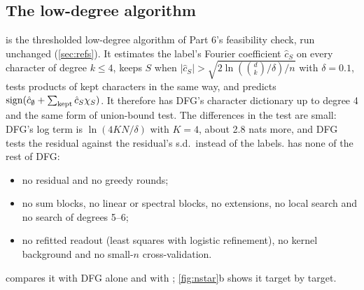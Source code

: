 \subsection{The low-degree algorithm}\label{app:lowdeg}

 is the thresholded low-degree algorithm \cite{linial1993constant} of Part 6's feasibility check, run unchanged (\cref{sec:refs}). It estimates the label's Fourier coefficient $\hat c_S$ on every character of degree $k\le4$, keeps $S$ when $|\hat c_S|>\sqrt{2\ln(\binom dk/\delta)/n}$ with $\delta=0.1$, tests products of kept characters in the same way, and predicts $\mathrm{sign}(\hat c_\emptyset+\sum_{\rm kept}\hat c_S\chi_S)$. It therefore has DFG's character dictionary up to degree 4 and the same form of union-bound test. The differences in the test are small: DFG's log term is $\ln(4KN/\delta)$ with $K=4$, about 2.8 nats more, and DFG tests the residual against the residual's s.d.\ instead of the labels.  has none of the rest of DFG:
\begin{itemize}
\item no residual and no greedy rounds;
\item no sum blocks, no linear or spectral blocks, no extensions, no local search and no search of degrees 5--6;
\item no refitted readout (least squares with logistic refinement), no kernel background and no small-$n$ cross-validation.
\end{itemize}
 compares it with DFG alone and with ; \cref{fig:nstar}b shows it target by target.

\begin{table}[t]
\centering{\footnotesize\setlength{\tabcolsep}{3pt}
}
\caption{The low-degree algorithm  on every suite . Entries as in \cref{tab:suites}, but the ratios are those of 's $\nstar$ to the reference's (positive:  needs more data), so ``better'' and ``worse'' are 's. Last column: the targets that  never brings to 10\% test error by $n=16384$, with DFG alone's $\nstar$ in brackets. Source:  (\texttt{q3\_lowdeg}); 's runs: \texttt{toy\_\_lowdeg-perm\_\_<suite>.json} in .}
\label{tab:lowdeg}
\end{table}


